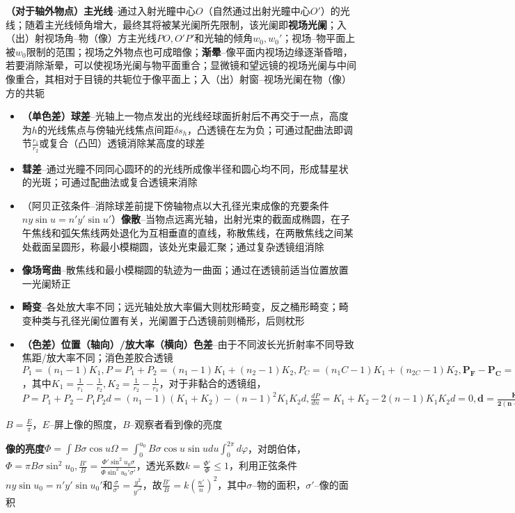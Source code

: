 \documentclass[10pt,a4paper]{article}
\begin{document}
\textbf{（对于轴外物点）主光线}--通过入射光瞳中心$O$（自然通过出射光瞳中心$O'$）的光线；随着主光线倾角增大，最终其将被某光阑所先限制，该光阑即\textbf{视场光阑}；入（出）射视场角--物（像）方主光线$PO,O'P'$和光轴的倾角$w_0,w_0'$；视场--物平面上被$w_0$限制的范围；视场之外物点也可成暗像；\textbf{渐晕}--像平面内视场边缘逐渐昏暗，若要消除渐晕，可以使视场光阑与物平面重合；显微镜和望远镜的视场光阑与中间像重合，其相对于目镜的共轭位于像平面上；入（出）射窗--视场光阑在物（像）方的共轭

\begin{itemize}
  \item \textbf{（单色差）球差}--光轴上一物点发出的光线经球面折射后不再交于一点，高度为$h$的光线焦点与傍轴光线焦点间距$\delta s_h$，凸透镜在左为负；可通过配曲法即调节$\frac{r_1}{r_2}$或复合（凸凹）透镜消除某高度的球差
  \item \textbf{彗差}--通过光瞳不同同心圆环的的光线所成像半径和圆心均不同，形成彗星状的光斑；可通过配曲法或复合透镜来消除
  \item （阿贝正弦条件--消除球差前提下傍轴物点以大孔径光束成像的充要条件$ny\sin u=n'y'\sin u'$）\textbf{像散}--当物点远离光轴，出射光束的截面成椭圆，在子午焦线和弧矢焦线两处退化为互相垂直的直线，称散焦线，在两散焦线之间某处截面呈圆形，称最小模糊圆，该处光束最汇聚；通过复杂透镜组消除
  \item \textbf{像场弯曲}--散焦线和最小模糊圆的轨迹为一曲面；通过在透镜前适当位置放置一光阑矫正
  \item \textbf{畸变}--各处放大率不同；远光轴处放大率偏大则枕形畸变，反之桶形畸变；畸变种类与孔径光阑位置有关，光阑置于凸透镜前则桶形，后则枕形
  \item \textbf{（色差）位置（轴向）/放大率（横向）色差}--由于不同波长光折射率不同导致焦距/放大率不同；消色差胶合透镜$P_1=(n_1-1)K_1,P=P_1+P_2=(n_1-1)K_1+(n_2-1)K_2,P_C=(n_1C-1)K_1+(n_{2C}-1)K_2,\bm{P_F-P_C=(n_{1F}-n_{1C})K_1+(n_{2F}-n_{2C})K_2=0}$，其中$K_1=\frac{1}{r_1}-\frac{1}{r_2},K_2=\frac{1}{r_2}-\frac{1}{r_3}$，对于非黏合的透镜组，$P=P_1+P_2-P_1P_2d=(n_1-1)(K_1+K_2)-(n-1)^2K_1K_2d,\frac{dP}{dn}=K_1+K_2-2(n-1)K_1K_2d=0,\bm{d=\frac{K_1+K_2}{2(n-1)K_1K_2d}=\frac{P_1+P_2}{2P_1P_2}=\frac{f_1+f_2}{2}}$
\end{itemize}

$B=\frac{E}{\pi}$，$E$--屏上像的照度，$B$--观察者看到像的亮度

\textbf{像的亮度}$\Phi=\int B\sigma\cos u\Omega=\int_0^{u_0}B\sigma\cos u\sin udu\int_0^{2\pi}d\varphi$，对朗伯体，$\Phi=\pi B\sigma\sin^2u_0,\frac{B'}{B}=\frac{\Phi'\sin^2u_0\sigma}{\Phi\sin^2u_0'\sigma'}$，透光系数$k=\frac{\Phi'}{\Phi}\leq1$，利用正弦条件$ny\sin u_0=n'y'\sin u_0'$和$\frac{\sigma}{\sigma'}=\frac{y^2}{y'^2}$，故$\frac{B'}{B}=k(\frac{n'}{n})^2$，其中$\sigma$--物的面积，$\sigma'$--像的面积
\end{document}
